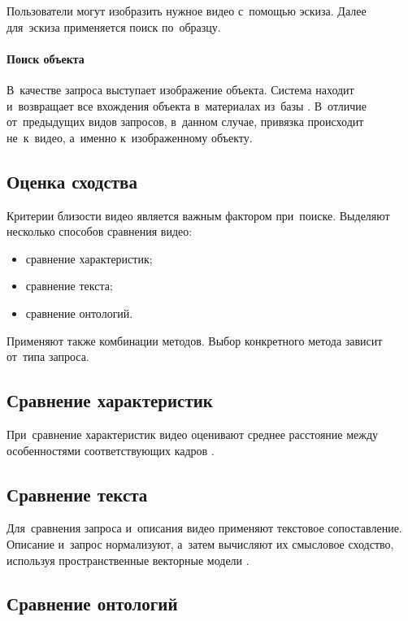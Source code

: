 Пользователи могут изобразить нужное видео с~помощью эскиза.
Далее для~эскиза применяется поиск по~образцу.

\paragraph{Поиск объекта}

В~качестве запроса выступает изображение объекта.
Система находит и~возвращает все вхождения объекта
в~материалах из~базы \cite{Sivic:2006}.
В~отличие от~предыдущих видов запросов,
в~данном случае, привязка происходит не~к~видео,
а~именно к~изображенному объекту.


\subsection{Оценка сходства}


Критерии близости видео является важным фактором при~поиске.
Выделяют несколько способов сравнения видео:
\begin{itemize}
    \item сравнение характеристик;
    \item сравнение текста;
    \item сравнение онтологий.
\end{itemize}

Применяют также комбинации методов.
Выбор конкретного метода зависит от~типа запроса.

\subsection{Сравнение характеристик}

При~сравнение характеристик видео оценивают среднее расстояние между
особенностями соответствующих кадров \cite{Browne:2005}.

\subsection{Сравнение текста}

Для~сравнения запроса и~описания видео
применяют текстовое сопоставление.
Описание и~запрос нормализуют,
а~затем вычисляют их смысловое сходство,
используя пространственные векторные модели \cite{Snoek:2007}.

\subsection{Сравнение онтологий}

